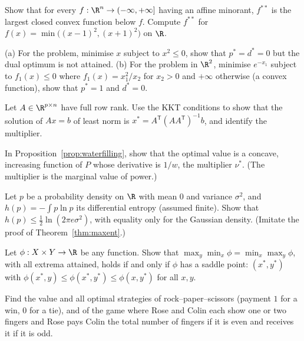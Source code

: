 \begin{exercise}[$\star\star$]\label{ex:envelope}
Show that for every $f:\R^n\to(-\infty,+\infty]$ having an affine minorant, $f^{**}$ is the largest closed convex function below $f$. Compute $f^{**}$ for
$f(x)=\min\bigl((x-1)^2,(x+1)^2\bigr)$ on $\R$.
\end{exercise}

\begin{exercise}[$\star\star$]\label{ex:slaterfail}
(a) For the problem, minimise $x$ subject to $x^2\le0$, show that $p^*=d^*=0$ but the dual optimum is not attained. (b) For the problem in $\R^2$, minimise $e^{-x_1}$ subject to
$f_1(x)\le0$ where $f_1(x)=x_1^2/x_2$ for $x_2>0$ and $+\infty$ otherwise (a convex function), show that $p^*=1$ and $d^*=0$.
\end{exercise}

\begin{exercise}[$\star$]\label{ex:leastnorm}
Let $A\in\R^{p\times n}$ have full row rank. Use the KKT conditions to show that the solution of $Ax=b$ of least norm is $x^*=A^{\mathsf T}(AA^{\mathsf T})^{-1}b$, and identify the multiplier.
\end{exercise}

\begin{exercise}[$\star$]\label{ex:waterlevel}
In Proposition~\ref{prop:waterfilling}, show that the optimal value is a concave, increasing function of $P$ whose derivative is $1/w$, the multiplier $\nu^*$. (The multiplier is
the marginal value of power.)
\end{exercise}

\begin{exercise}[$\star\star$]\label{ex:maxentgauss}
Let $p$ be a probability density on $\R$ with mean $0$ and variance $\sigma^2$, and $h(p)=-\int p\ln p$ its differential entropy (assumed finite). Show that
$h(p)\le\frac12\ln(2\pi e\sigma^2)$, with equality only for the Gaussian density. (Imitate the proof of Theorem~\ref{thm:maxent}.)
\end{exercise}

\begin{exercise}[$\star$]\label{ex:saddle}
Let $\phi:X\times Y\to\R$ be any function. Show that $\max_y\min_x\phi=\min_x\max_y\phi$, with all extrema attained, holds if and only if $\phi$ has a saddle point: $(x^*,y^*)$ with
$\phi(x^*,y)\le\phi(x^*,y^*)\le\phi(x,y^*)$ for all $x,y$.
\end{exercise}

\begin{exercise}[$\star$]\label{ex:rps}
Find the value and all optimal strategies of rock--paper--scissors (payment $1$ for a win, $0$ for a tie), and of the game where Rose and Colin each show one or two fingers
and Rose pays Colin the total number of fingers if it is even and receives it if it is odd.
\end{exercise}

